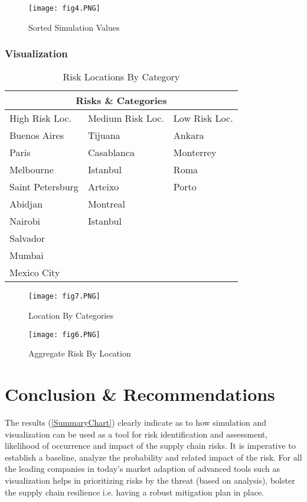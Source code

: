 \documentclass[conference]{IEEEtran}
\begin{document}
\begin{figure}[thpb]
\centering
\texttt{[image: fig4.PNG]}
\caption{Sorted Simulation Values}
\label{SortedValues}
\end{figure}

\subsubsection{Visualization}

\begin{table}[h!]
\centering
\caption{Risk Locations By Category}
\label{RiskLocAndCategory}
\begin{tabular}{|p{2cm}||p{2cm}|p{2cm}|}
\hline
\multicolumn{3}{|c|}{Risks \& Categories} \\
\hline
High Risk Loc. & Medium Risk Loc. & Low Risk Loc. \\
\hline
Buenos Aires & Tijuana  & Ankara \\
Paris & Casablanca & Monterrey \\
Melbourne & Istanbul & Roma \\
Saint Petersburg & Arteixo & Porto \\
Abidjan & Montreal & \\
Nairobi & Istanbul  &  \\
Salvador &  &  \\
Mumbai &  &  \\
Mexico City &  &  \\
\hline
\end{tabular}
\end{table}


\begin{figure}[thpb]
	\centering
	\texttt{[image: fig7.PNG]}
	\caption{Location By Categories}
	\label{LocByCategory}
\end{figure}

\begin{figure}[thpb]
	\centering
	\texttt{[image: fig6.PNG]}
	\caption{Aggregate Risk By Location}
	\label{AggregateRiskLoc}
\end{figure}

\section{Conclusion \& Recommendations}
The results (\ref{SummaryChart}) clearly indicate as to how simulation and visualization can be used as a tool for risk identification and assessment, likelihood of occurrence and impact of the supply chain risks. It is imperative to establish a baseline, analyze the probability and related impact of the risk. For all the leading companies in today’s market adaption of advanced tools such as visualization helps in prioritizing risks by the threat (based on analysis), bolster the supply chain resilience i.e. having a robust mitigation plan in place.\newline
\end{document}
